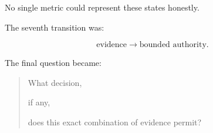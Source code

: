 \documentclass[11pt,a4paper,oneside]{report}
\begin{document}
No single metric could represent these states honestly.



The seventh transition was:



\begin{equation}
\text{evidence}
\rightarrow
\text{bounded authority}.
\end{equation}



The final question became:



\begin{quote}



What decision,

if any,

does this exact combination of evidence permit?



\end{quote}
\end{document}
